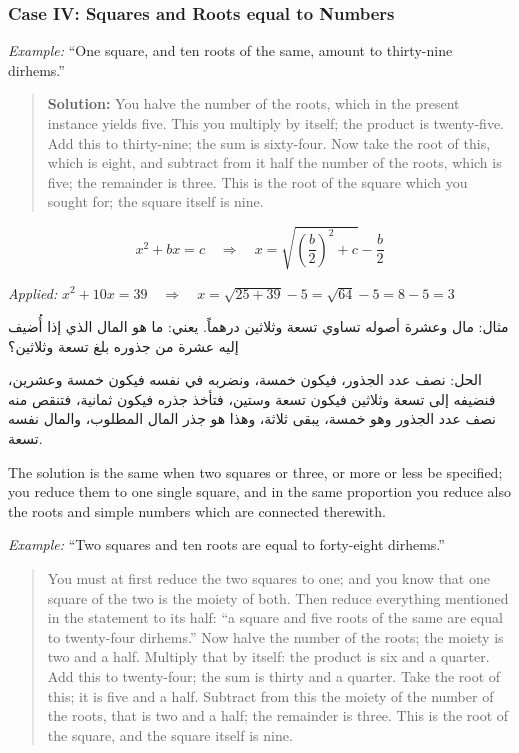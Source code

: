 \documentclass[11pt,a4paper,openany,oneside]{book}
\begin{document}
\subsubsection*{Case IV: Squares and Roots equal to Numbers}

\textit{Example:} ``One square, and ten roots of the same, amount to
thirty-nine dirhems.''

\begin{quote}
\textbf{Solution:} You halve the number of the roots, which in the present
instance yields five. This you multiply by itself; the product is twenty-five.
Add this to thirty-nine; the sum is sixty-four. Now take the root of this,
which is eight, and subtract from it half the number of the roots, which is
five; the remainder is three. This is the root of the square which you sought
for; the square itself is nine.
\end{quote}

\begin{mathbox}[title={\textbf{The Algorithm for Case IV}}]
\begin{equation}
x^2 + bx = c \quad\Longrightarrow\quad x = \sqrt{\left(\frac{b}{2}\right)^2 + c} - \frac{b}{2}
\end{equation}

\textit{Applied:} $x^2 + 10x = 39 \quad\Rightarrow\quad x = \sqrt{25 + 39} - 5 = \sqrt{64} - 5 = 8 - 5 = 3$
\end{mathbox}

\begin{arabicbox}
\begin{Arabic}
مثال: مال وعشرة أصوله تساوي تسعة وثلاثين درهماً. يعني: ما هو
المال الذي إذا أُضيف إليه عشرة من جذوره بلغ تسعة وثلاثين؟

الحل: نصف عدد الجذور، فيكون خمسة، ونضربه في نفسه فيكون
خمسة وعشرين، فنضيفه إلى تسعة وثلاثين فيكون تسعة وستين،
فتأخذ جذره فيكون ثمانية، فتنقص منه نصف عدد الجذور وهو خمسة،
يبقى ثلاثة، وهذا هو جذر المال المطلوب، والمال نفسه تسعة.
\end{Arabic}
\end{arabicbox}

The solution is the same when two squares or three, or more or less be
specified; you reduce them to one single square, and in the same proportion
you reduce also the roots and simple numbers which are connected therewith.

\textit{Example:} ``Two squares and ten roots are equal to forty-eight
  dirhems.''

\begin{quote}
You must at first reduce the two squares to one; and you know that one square
of the two is the moiety of both. Then reduce everything mentioned in the
statement to its half: ``a square and five roots of the same are equal to
twenty-four dirhems.'' Now halve the number of the roots; the moiety is two
and a half. Multiply that by itself: the product is six and a quarter. Add
this to twenty-four; the sum is thirty and a quarter. Take the root of this;
it is five and a half. Subtract from this the moiety of the number of the
roots, that is two and a half; the remainder is three. This is the root of
the square, and the square itself is nine.
\end{quote}
\end{document}
